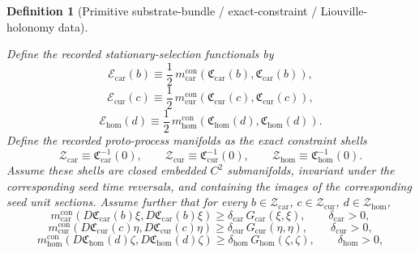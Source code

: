 \documentclass[11pt]{article}
\newcommand{\TensorProtoSpace}{\mathcal Z_{\mathrm{car}}}
\newcommand{\CurProtoSpace}{\mathcal Z_{\mathrm{cur}}}
\newcommand{\HomProtoSpace}{\mathcal Z_{\mathrm{hom}}}
\newcommand{\TensorSelection}{\mathscr E_{\mathrm{car}}}
\newcommand{\CurSelection}{\mathscr E_{\mathrm{cur}}}
\newcommand{\HomSelection}{\mathscr E_{\mathrm{hom}}}
\newcommand{\TensorSeedMetric}{G_{\mathrm{car}}}
\newcommand{\CurSeedMetric}{G_{\mathrm{cur}}}
\newcommand{\HomSeedMetric}{G_{\mathrm{hom}}}
\newcommand{\TensorConstraintMetric}{m_{\mathrm{car}}^{\mathrm{con}}}
\newcommand{\CurConstraintMetric}{m_{\mathrm{cur}}^{\mathrm{con}}}
\newcommand{\HomConstraintMetric}{m_{\mathrm{hom}}^{\mathrm{con}}}
\newcommand{\TensorConstraintMap}{\mathfrak C_{\mathrm{car}}}
\newcommand{\CurConstraintMap}{\mathfrak C_{\mathrm{cur}}}
\newcommand{\HomConstraintMap}{\mathfrak C_{\mathrm{hom}}}
\newcommand{\TensorConstraintGap}{\delta_{\mathrm{car}}}
\newcommand{\CurConstraintGap}{\delta_{\mathrm{cur}}}
\newcommand{\HomConstraintGap}{\delta_{\mathrm{hom}}}
\newtheorem{definition}{Definition}
\begin{document}
\begin{definition}[Primitive substrate-bundle / exact-constraint / Liouville-holonomy data]
\begin{enumerate}
    Define the recorded stationary-selection functionals by
    \begin{equation}
    \TensorSelection(b)
    \equiv
    \frac12\,\TensorConstraintMetric\!\left(\TensorConstraintMap(b),\TensorConstraintMap(b)\right),
    \label{eq:selection_from_constraint_car}
    \end{equation}
    \begin{equation}
    \CurSelection(c)
    \equiv
    \frac12\,\CurConstraintMetric\!\left(\CurConstraintMap(c),\CurConstraintMap(c)\right),
    \label{eq:selection_from_constraint_cur}
    \end{equation}
    \begin{equation}
    \HomSelection(d)
    \equiv
    \frac12\,\HomConstraintMetric\!\left(\HomConstraintMap(d),\HomConstraintMap(d)\right).
    \label{eq:selection_from_constraint_hom}
    \end{equation}
    Define the recorded proto-process manifolds as the exact constraint shells
    \begin{equation}
    \TensorProtoSpace
    \equiv
    \TensorConstraintMap^{-1}(0),
    \qquad
    \CurProtoSpace
    \equiv
    \CurConstraintMap^{-1}(0),
    \qquad
    \HomProtoSpace
    \equiv
    \HomConstraintMap^{-1}(0).
    \label{eq:proto_shells}
    \end{equation}
    Assume these shells are closed embedded \(C^2\) submanifolds, invariant under the corresponding seed time reversals, and containing the images of the corresponding seed unit sections. Assume further that for every \(b\in\TensorProtoSpace\), \(c\in\CurProtoSpace\), \(d\in\HomProtoSpace\),
    \begin{equation}
    \TensorConstraintMetric\!\left(D\TensorConstraintMap(b)\xi,D\TensorConstraintMap(b)\xi\right)
    \ge
    \TensorConstraintGap\,\TensorSeedMetric(\xi,\xi),
    \qquad
    \TensorConstraintGap>0,
    \label{eq:constraint_gap_car}
    \end{equation}
    \begin{equation}
    \CurConstraintMetric\!\left(D\CurConstraintMap(c)\eta,D\CurConstraintMap(c)\eta\right)
    \ge
    \CurConstraintGap\,\CurSeedMetric(\eta,\eta),
    \qquad
    \CurConstraintGap>0,
    \label{eq:constraint_gap_cur}
    \end{equation}
    \begin{equation}
    \HomConstraintMetric\!\left(D\HomConstraintMap(d)\zeta,D\HomConstraintMap(d)\zeta\right)
    \ge
    \HomConstraintGap\,\HomSeedMetric(\zeta,\zeta),
    \qquad
    \HomConstraintGap>0,

\end{equation}
\end{enumerate}
\end{definition}
\end{document}
